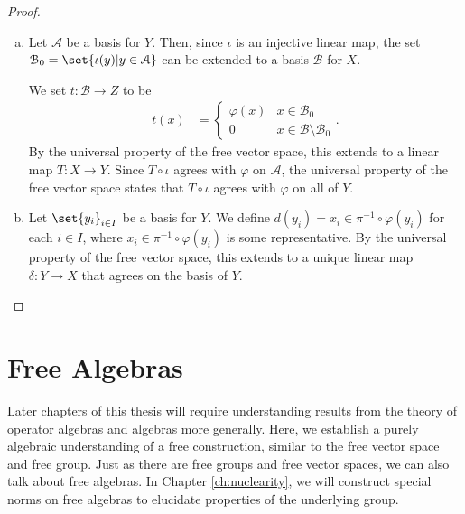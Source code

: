 \begin{proof}\hfill
  \begin{enumerate}[(a)]
    \item Let $\mathcal{A}$ be a basis for $Y$. Then, since $\iota$ is an injective linear map, the set $\mathcal{B}_0 = \set{\iota(y) | y\in \mathcal{A}}$ can be extended to a basis $\mathcal{B}$ for $X$.\newline

      We set $t\colon \mathcal{B}\rightarrow Z$ to be
      \begin{align*}
        t\left(x\right) &= \begin{cases}
          \varphi(x) & x\in \mathcal{B}_0\\
          0 & x\in \mathcal{B}\setminus \mathcal{B}_0
        \end{cases}.
      \end{align*}
      By the universal property of the free vector space, this extends to a linear map $T\colon X\rightarrow Y$. Since $T\circ\iota$ agrees with $\varphi$ on $\mathcal{A}$, the universal property of the free vector space states that $T\circ\iota$ agrees with $\varphi$ on all of $Y$.
    \item Let $\set{y_i}_{i\in I}$ be a basis for $Y$. We define $d\left( y_i \right) = x_i\in  \pi^{-1}\circ \varphi\left( y_i \right)$ for each $i\in I$, where $x_i\in \pi^{-1}\circ \varphi\left( y_i \right)$ is some representative.  By the universal property of the free vector space, this extends to a unique linear map $\delta\colon Y\rightarrow X$ that agrees on the basis of $Y$.
  \end{enumerate}
\end{proof}

\section{Free Algebras}%
Later chapters of this thesis will require understanding results from the theory of operator algebras and algebras more generally. Here, we establish a purely algebraic understanding of a free construction, similar to the free vector space and free group. Just as there are free groups and free vector spaces, we can also talk about free algebras. In Chapter \ref{ch:nuclearity}, we will construct special norms on free algebras to elucidate properties of the underlying group.\newline

